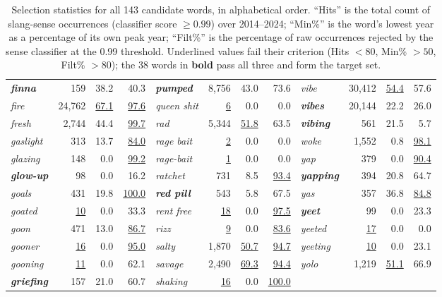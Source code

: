 \documentclass[11pt]{article}
\begin{document}
\begin{table}[tp]
\begin{tabular}{lrrr@{\hskip 2em}lrrr@{\hskip 2em}lrrr}
\textbf{\textit{finna}} & 159 & 38.2 & 40.3 & \textbf{\textit{pumped}} & 8{,}756 & 43.0 & 73.6 & \textit{vibe} & 30{,}412 & \underline{54.4} & 57.6 \\
\textit{fire} & 24{,}762 & \underline{67.1} & \underline{97.6} & \textit{queen shit} & \underline{6} & 0.0 & 0.0 & \textbf{\textit{vibes}} & 20{,}144 & 22.2 & 26.0 \\
\textit{fresh} & 2{,}744 & 44.4 & \underline{99.7} & \textit{rad} & 5{,}344 & \underline{51.8} & 63.5 & \textbf{\textit{vibing}} & 561 & 21.5 & 5.7 \\
\textit{gaslight} & 313 & 13.7 & \underline{84.0} & \textit{rage bait} & \underline{2} & 0.0 & 0.0 & \textit{woke} & 1{,}552 & 0.8 & \underline{98.1} \\
\textit{glazing} & 148 & 0.0 & \underline{99.2} & \textit{rage-bait} & \underline{1} & 0.0 & 0.0 & \textit{yap} & 379 & 0.0 & \underline{90.4} \\
\textbf{\textit{glow-up}} & 98 & 0.0 & 16.2 & \textit{ratchet} & 731 & 8.5 & \underline{93.4} & \textbf{\textit{yapping}} & 394 & 20.8 & 64.7 \\
\textit{goals} & 431 & 19.8 & \underline{100.0} & \textbf{\textit{red pill}} & 543 & 5.8 & 67.5 & \textit{yas} & 357 & 36.8 & \underline{84.8} \\
\textit{goated} & \underline{10} & 0.0 & 33.3 & \textit{rent free} & \underline{18} & 0.0 & \underline{97.5} & \textbf{\textit{yeet}} & 99 & 0.0 & 23.3 \\
\textit{goon} & 471 & 13.0 & \underline{86.7} & \textit{rizz} & \underline{9} & 0.0 & \underline{83.6} & \textit{yeeted} & \underline{17} & 0.0 & 0.0 \\
\textit{gooner} & \underline{16} & 0.0 & \underline{95.0} & \textit{salty} & 1{,}870 & \underline{50.7} & \underline{94.7} & \textit{yeeting} & \underline{10} & 0.0 & 23.1 \\
\textit{gooning} & \underline{11} & 0.0 & 62.1 & \textit{savage} & 2{,}490 & \underline{69.3} & \underline{94.4} & \textit{yolo} & 1{,}219 & \underline{51.1} & 66.9 \\
\textbf{\textit{griefing}} & 157 & 21.0 & 60.7 & \textit{shaking} & \underline{16} & 0.0 & \underline{100.0} &  & & &  \\
\bottomrule
\end{tabular}
\caption{Selection statistics for all 143 candidate words, in alphabetical order.
``Hits'' is the total count of slang-sense occurrences (classifier score
$\geq 0.99$) over 2014--2024; ``Min\%'' is the word's lowest year as a percentage
of its own peak year; ``Filt\%'' is the percentage of raw occurrences rejected by
the sense classifier at the 0.99 threshold. Underlined values fail their criterion
(Hits $<80$, Min\% $>50$, Filt\% $>80$); the 38 words in \textbf{bold} pass all
three and form the target set.}%
\label{tab:words}
\end{table}
\end{document}
